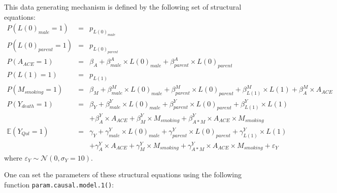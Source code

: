 \documentclass[
]{book}
\begin{document}
This data generating mechanism is defined by the following set of structural equations:
\[\begin{array}{lll}
P(L(0)_{male} = 1) &=& p_{L(0)_{male}}\\
P(L(0)_{parent} = 1) &=& p_{L(0)_{parent}}\\
P(A_{ACE} = 1) &=& \beta_{A} + \beta_{male}^A \times L(0)_{male} + \beta_{parent}^A \times L(0)_{parent}\\
P(L(1) = 1) &=& p_{L(1)}\\
P(M_{smoking} = 1) &=& \beta_{M} + \beta_{male}^M \times L(0)_{male} + \beta_{parent}^M \times L(0)_{parent} + \beta_{L(1)}^M \times L(1) + \beta_{A}^M \times A_{ACE}\\
P(Y_{death} = 1) &=& \beta_{Y} + \beta_{male}^Y \times L(0)_{male} + \beta_{parent}^Y \times L(0)_{parent} + \beta_{L(1)}^Y \times L(1)\\
                 & & + \beta_{A}^Y \times A_{ACE} + \beta_{M}^Y \times M_{smoking} + \beta_{A \ast M }^Y \times A_{ACE} \times M_{smoking}\\
\mathbb{E}(Y_{Qol} = 1) &=& \gamma_{Y} + \gamma_{male}^Y \times L(0)_{male} + \gamma_{parent}^Y \times L(0)_{parent} + \gamma_{L(1)}^Y \times L(1)\\
                        & &+ \gamma_{A}^Y \times A_{ACE} + \gamma_{M}^Y \times M_{smoking} + \gamma_{A \ast M }^Y \times A_{ACE} \times M_{smoking} + \varepsilon_Y
\end{array}\]
where \(\varepsilon_Y \sim \mathcal{N}(0,\sigma_Y = 10)\).

One can set the parameters of these structural equations using the following function \texttt{param.causal.model.1()}:
\end{document}
